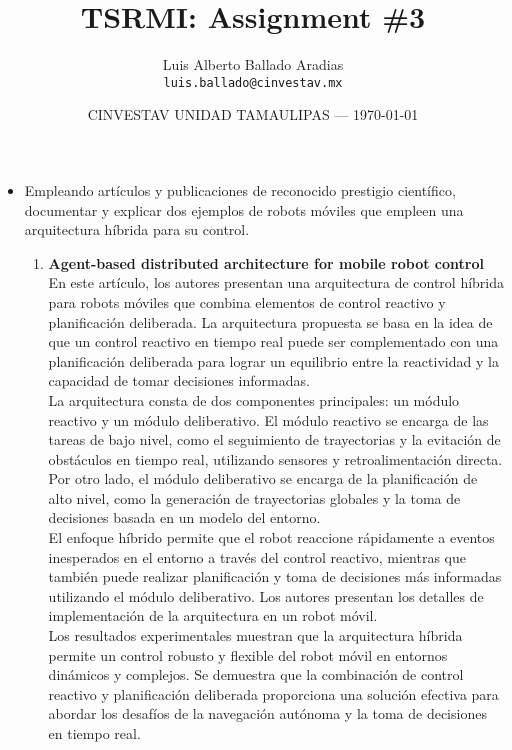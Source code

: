 \documentclass{article}
\title{TSRMI: Assignment \#3} %
\author{Luis Alberto Ballado Aradias\\ \texttt{luis.ballado@cinvestav.mx}} %
\date{CINVESTAV UNIDAD TAMAULIPAS --- \today} %
\begin{document}
\maketitle %


\begin{itemize}

\item{Empleando artículos y publicaciones de reconocido prestigio científico, documentar y explicar dos ejemplos de robots móviles que empleen una arquitectura híbrida para su control.}

  \begin{enumerate}

  \item \textbf{Agent-based distributed architecture for mobile robot control}
    En este artículo, los autores presentan una arquitectura de control híbrida para robots móviles que combina elementos de control reactivo y planificación deliberada. La arquitectura propuesta se basa en la idea de que un control reactivo en tiempo real puede ser complementado con una planificación deliberada para lograr un equilibrio entre la reactividad y la capacidad de tomar decisiones informadas.\\

    La arquitectura consta de dos componentes principales: un módulo reactivo y un módulo deliberativo. El módulo reactivo se encarga de las tareas de bajo nivel, como el seguimiento de trayectorias y la evitación de obstáculos en tiempo real, utilizando sensores y retroalimentación directa. Por otro lado, el módulo deliberativo se encarga de la planificación de alto nivel, como la generación de trayectorias globales y la toma de decisiones basada en un modelo del entorno.\\

    El enfoque híbrido permite que el robot reaccione rápidamente a eventos inesperados en el entorno a través del control reactivo, mientras que también puede realizar planificación y toma de decisiones más informadas utilizando el módulo deliberativo. Los autores presentan los detalles de implementación de la arquitectura en un robot móvil.\\
    Los resultados experimentales muestran que la arquitectura híbrida permite un control robusto y flexible del robot móvil en entornos dinámicos y complejos. Se demuestra que la combinación de control reactivo y planificación deliberada proporciona una solución efectiva para abordar los desafíos de la navegación autónoma y la toma de decisiones en tiempo real.
    

\end{enumerate}
\end{itemize}
\end{document}
